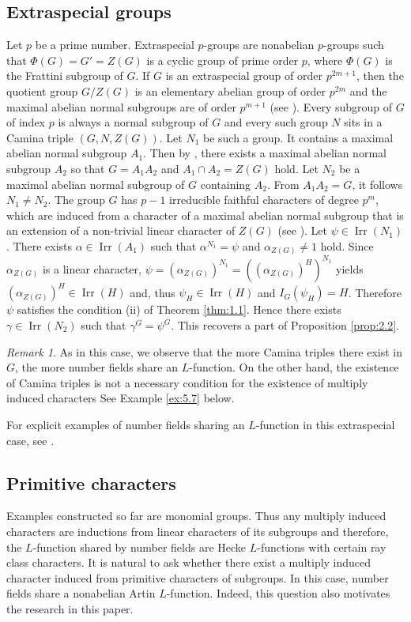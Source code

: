 \documentclass[a4paper,12pt]{article}
\theoremstyle{definition}
\theoremstyle{remark}
\newtheorem{remark}[theorem]{Remark}
\DeclareMathOperator{\irr}{Irr}
\numberwithin{equation}{section}
\begin{document}
\subsection{Extraspecial groups} \label{sec:5.2}
Let $p$ be a prime number.
Extraspecial $p$-groups are nonabelian $p$-groups such that $\Phi (G) = G' = Z(G)$ 
is a cyclic group of prime order $p$, where $\Phi (G)$ is the Frattini subgroup of $G$.
If $G$ is an extraspecial group of order $p^{2m+1}$, then
the quotient group $G/Z(G)$ is an elementary abelian group of order $p^{2m}$ and 
the maximal abelian normal subgroups are of order $p^{m+1}$ (see \cite[III.13.7 Satz]{MR0224703}).
Every subgroup of $G$ of index $p$ is always a normal subgroup of $G$ and every such group $N$
sits in a Camina triple $(G,N,Z(G))$.
Let $N_1$ be such a group. It contains a maximal abelian normal subgroup $A_1$.
Then by \cite[III.13.7 Satz f)]{MR0224703}, there exists a maximal abelian 
normal subgroup $A_2$ so that  $G=A_1 A_2 $ and $A_1 \cap A_2 = Z(G)$ hold.
Let $N_2$ be a maximal abelian normal subgroup of $G$ containing $A_2$.
From $A_1 A_2 = G$, it follows $N_1 \neq N_2$.     
The group $G$ has $p-1$ irreducible faithful 
characters of degree $p^m$, which are induced from a character 
of a maximal abelian normal subgroup that is an extension of a non-trivial linear 
character of $Z(G)$ (see \cite[V.16.14 Satz]{MR0224703}).
Let $\psi \in \irr (N_1)$. There exists $\alpha \in \irr (A_1) $ such that 
$\alpha^{N_1} = \psi$ and $\alpha_{Z (G)} \neq 1 $ hold.
Since $\alpha_{Z (G)}$ is a linear character, $\psi = (\alpha_{Z (G)})^{N_1} 
= ((\alpha_{Z (G)})^H)^{N_1} $ yields $(\alpha_{Z (G)})^H \in \irr (H)$ and, thus 
$\psi_H \in \irr (H)$ and $I_G (\psi_H) =H $. Therefore $\psi $ satisfies the condition (ii) of 
Theorem \ref{thm:1.1}. Hence there exists $\gamma \in \irr (N_2)$ such that $\gamma^G = \psi^G$.
This recovers a part of Proposition \ref{prop:2.2}. 

\begin{remark}
As in this case, we observe that 
the more Camina triples there exist in $G$, the more number fields share an $L$-function.
On the other hand, the existence of Camina triples is not a necessary condition for the existence of multiply induced characters
See Example \ref{ex:5.7} below.
\end{remark}

For explicit examples of number fields sharing an $L$-function in this extraspecial case, 
see \cite[Example 3.4]{MR4474773}.


\subsection{Primitive characters} \label{sec:5.3}
Examples constructed so far are monomial groups. Thus any multiply induced characters are inductions
from linear characters of its subgroups and therefore, the $L$-function shared by number fields
are Hecke $L$-functions with certain ray class characters.
It is natural to ask whether there exist a multiply induced character induced from 
primitive characters of subgroups.
In this case, number fields share a nonabelian Artin $L$-function. Indeed, this question also motivates 
the research in this paper.
\end{document}
